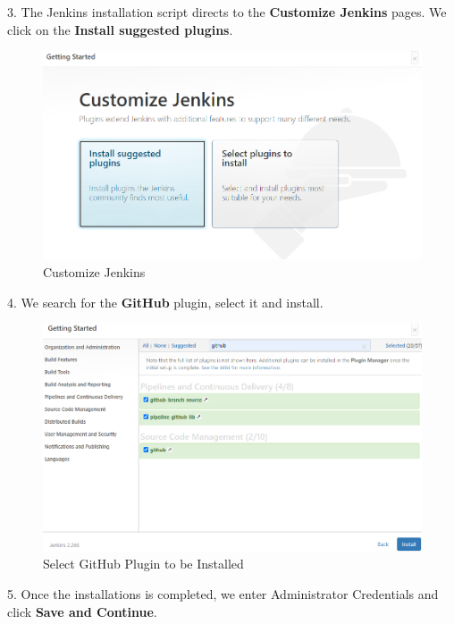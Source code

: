 \documentclass[12pt,a4paper,twoside]{article}
\begin{document}
3. The Jenkins installation script directs to the \textbf{Customize Jenkins} pages. We click on the  \textbf{Install suggested plugins}.

\begin{figure}[h!]
    \centering
        \includegraphics[width=15cm]{images-aws/24-jenkins-select-plugin.png}
        \caption{Customize Jenkins}
\end{figure}


4. We search for the \textbf{GitHub} plugin, select it and install.

\begin{figure}[h!]
    \centering
        \includegraphics[width=15cm]{images-aws/25-jenkins-select-github-plugin.png}
        \caption{Select GitHub Plugin to be Installed}
\end{figure}




5. Once the installations is completed, we enter Administrator Credentials and click \textbf{Save and Continue}.
\end{document}
